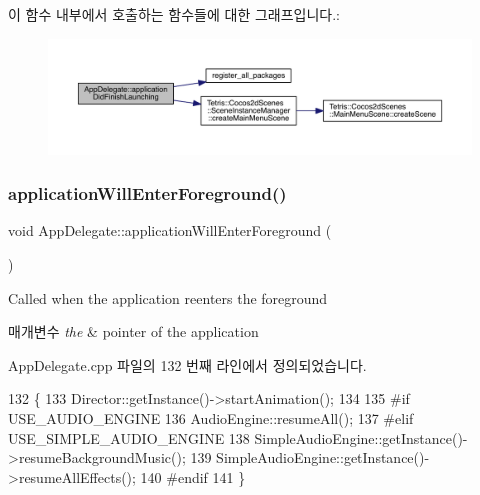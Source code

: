 이 함수 내부에서 호출하는 함수들에 대한 그래프입니다.\+:
\nopagebreak
\begin{figure}[H]
\begin{center}
\leavevmode
\includegraphics[width=350pt]{d5/d5d/class_app_delegate_a68cbaed49edf7581dc59a09d5062fff3_cgraph}
\end{center}
\end{figure}
\mbox{\label{class_app_delegate_ac4d653e3f74a91efef5f2def58fe3108}} 
\subsubsection{\texorpdfstring{application\+Will\+Enter\+Foreground()}{applicationWillEnterForeground()}}
{\footnotesize\ttfamily void App\+Delegate\+::application\+Will\+Enter\+Foreground (\begin{DoxyParamCaption}{ }\end{DoxyParamCaption})\hspace{0.3cm}{\ttfamily [virtual]}}



Called when the application reenters the foreground 


\begin{DoxyParams}{매개변수}
{\em the} & pointer of the application \\
\hline
\end{DoxyParams}


App\+Delegate.\+cpp 파일의 132 번째 라인에서 정의되었습니다.


\begin{DoxyCode}
132                                                  \{
133     Director::getInstance()->startAnimation();
134 
135 \textcolor{preprocessor}{#if USE\_AUDIO\_ENGINE}
136     AudioEngine::resumeAll();
137 \textcolor{preprocessor}{#elif USE\_SIMPLE\_AUDIO\_ENGINE}
138     SimpleAudioEngine::getInstance()->resumeBackgroundMusic();
139     SimpleAudioEngine::getInstance()->resumeAllEffects();
140 \textcolor{preprocessor}{#endif}
141 \}
\end{DoxyCode}
\mbox{\label{class_app_delegate_a2de4e8ab7d04bde311684e1d4ceb2c0f}} 
